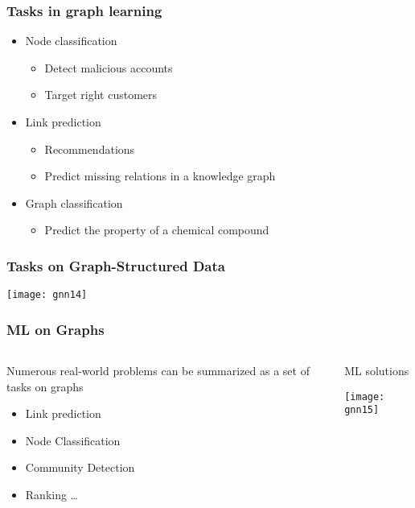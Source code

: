 \begin{frame}[fragile]\frametitle{Tasks in graph learning}

\begin{itemize}
\item Node classification
	\begin{itemize}
	\item Detect malicious accounts
	\item Target right customers
	\end{itemize}

\item Link prediction
	\begin{itemize}
	\item Recommendations
	\item Predict missing relations in a knowledge graph
	\end{itemize}

\item Graph classification
	\begin{itemize}
	\item Predict the property of a chemical compound
	\end{itemize}
\end{itemize}

\end{frame}

\begin{frame}[fragile]\frametitle{Tasks on Graph-Structured Data}

\begin{center}
\texttt{[image: gnn14]}
\end{center}	  

\end{frame}

\begin{frame}[fragile]\frametitle{ML on Graphs}
\begin{columns}
    \begin{column}[T]{0.6\linewidth}
		Numerous real-world problems can be summarized as a set of tasks on graphs

    \begin{itemize}
		\item Link prediction 
		\item Node Classification 
		\item Community Detection 
		\item Ranking \ldots
	  \end{itemize}

    \end{column}
    \begin{column}[T]{0.4\linewidth}
		ML solutions
		\begin{center}
		\texttt{[image: gnn15]}
		\end{center}	 
    \end{column}
  \end{columns}
\end{frame}


